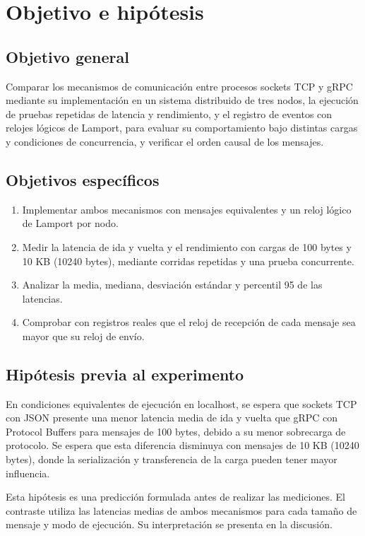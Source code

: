 \section{Objetivo e hipótesis}

\subsection{Objetivo general}

Comparar los mecanismos de comunicación entre procesos sockets TCP y gRPC
mediante su implementación en un sistema distribuido de tres nodos, la ejecución
de pruebas repetidas de latencia y rendimiento, y el registro de eventos con
relojes lógicos de Lamport, para evaluar su comportamiento bajo distintas cargas
y condiciones de concurrencia, y verificar el orden causal de los mensajes.

\subsection{Objetivos específicos}

\begin{enumerate}
    \item Implementar ambos mecanismos con mensajes equivalentes y un reloj
    lógico de Lamport por nodo.
    \item Medir la latencia de ida y vuelta y el rendimiento con cargas de
    100 bytes y 10 KB (10240 bytes), mediante corridas repetidas y una prueba
    concurrente.
    \item Analizar la media, mediana, desviación estándar y percentil 95 de
    las latencias.
    \item Comprobar con registros reales que el reloj de recepción de cada
    mensaje sea mayor que su reloj de envío.
\end{enumerate}

\subsection{Hipótesis previa al experimento}

En condiciones equivalentes de ejecución en localhost, se espera que sockets
TCP con JSON presente una menor latencia media de ida y vuelta que gRPC con
Protocol Buffers para mensajes de 100 bytes, debido a su menor sobrecarga de
protocolo. Se espera que esta diferencia disminuya con mensajes de 10 KB
(10240 bytes), donde la serialización y transferencia de la carga pueden tener
mayor influencia.

Esta hipótesis es una predicción formulada antes de realizar las mediciones.
El contraste utiliza las latencias medias de ambos mecanismos para cada tamaño
de mensaje y modo de ejecución. Su interpretación se presenta en la discusión.
